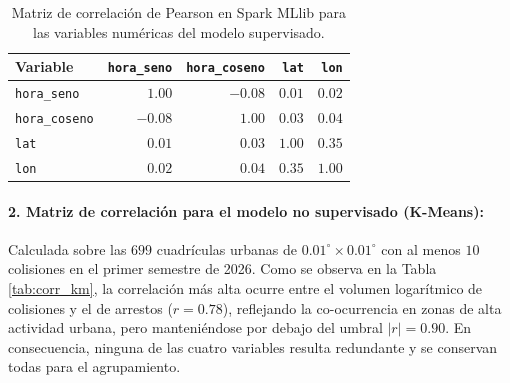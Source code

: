 \begin{table}[H]
\centering
\small
\renewcommand{\arraystretch}{1.2}
\caption{Matriz de correlación de Pearson en Spark MLlib para las variables numéricas del modelo supervisado.}
\label{tab:corr_lr}
\begin{tabular}{l r r r r}
\toprule
\textbf{Variable} & \textbf{\texttt{hora\_seno}} & \textbf{\texttt{hora\_coseno}} & \textbf{\texttt{lat}} & \textbf{\texttt{lon}} \\
\midrule
\texttt{hora\_seno} & $1.00$ & $-0.08$ & $0.01$ & $0.02$ \\
\texttt{hora\_coseno} & $-0.08$ & $1.00$ & $0.03$ & $0.04$ \\
\texttt{lat} & $0.01$ & $0.03$ & $1.00$ & $\mathbf{0.35}$ \\
\texttt{lon} & $0.02$ & $0.04$ & $\mathbf{0.35}$ & $1.00$ \\
\bottomrule
\end{tabular}
\end{table}

\paragraph{2. Matriz de correlación para el modelo no supervisado (K-Means):}
Calculada sobre las $699$ cuadrículas urbanas de $0.01^\circ \times 0.01^\circ$ con al menos $10$ colisiones en el primer semestre de 2026. Como se observa en la Tabla \ref{tab:corr_km}, la correlación más alta ocurre entre el volumen logarítmico de colisiones y el de arrestos ($r = 0.78$), reflejando la co-ocurrencia en zonas de alta actividad urbana, pero manteniéndose por debajo del umbral $|r| = 0.90$. En consecuencia, ninguna de las cuatro variables resulta redundante y se conservan todas para el agrupamiento.

\begin{table}[H]
\centering
\scriptsize
\renewcommand{\arraystretch}{1.2}
\caption{Matriz de correlación de Pearson en Spark MLlib para las variables de perfil territorial (K-Means).}
\label{tab:corr_km}
\end{table}

